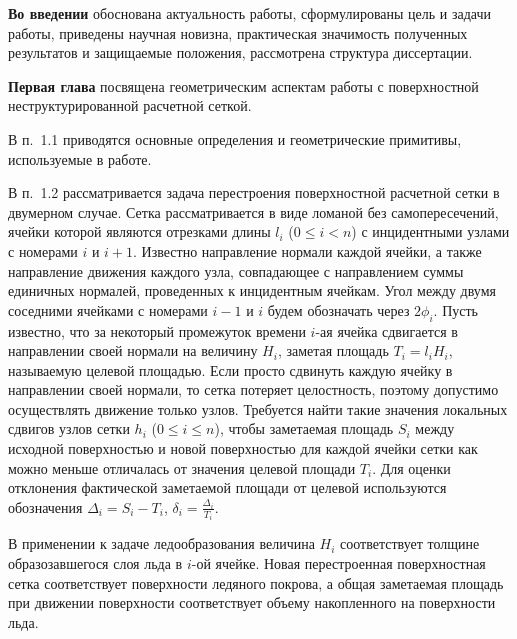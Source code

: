 \documentclass[a4paper,14pt]{extarticle}                     %
\theoremstyle{plain}                                         %
\begin{document}
\textbf{Во введении} обоснована актуальность работы, сформулированы цель и задачи работы, приведены научная новизна, практическая значимость полученных результатов и защищаемые положения, рассмотрена структура диссертации. 


\textbf{Первая глава} посвящена геометрическим аспектам работы с поверхностной неструктурированной расчетной сеткой.


В п.~1.1 приводятся основные определения и геометрические примитивы, используемые в работе.


В п.~1.2 рассматривается задача перестроения поверхностной расчетной сетки в двумерном случае. Сетка рассматривается в виде ломаной без самопересечений, ячейки которой являются отрезками длины $l_i$ ($0 \le i < n$) с инцидентными узлами с номерами $i$ и $i + 1$.
Известно направление нормали каждой ячейки, а также направление движения каждого узла, совпадающее с направлением суммы единичных нормалей, проведенных к инцидентным ячейкам.
Угол между двумя соседними ячейками с номерами $i - 1$ и $i$ будем обозначать через $2 \phi_i$.
Пусть известно, что за некоторый промежуток времени $i$-ая ячейка сдвигается в направлении своей нормали на величину $H_i$, заметая площадь $T_i = l_i H_i$, называемую целевой площадью.
Если просто сдвинуть каждую ячейку в направлении своей нормали, то сетка потеряет целостность, поэтому допустимо осуществлять движение только узлов.
Требуется найти такие значения локальных сдвигов узлов сетки $h_i$ ($0 \le i \le n$), чтобы заметаемая площадь $S_i$ между исходной поверхностью и новой поверхностью для каждой ячейки сетки как можно меньше отличалась от значения целевой площади $T_i$.
Для оценки отклонения фактической заметаемой площади от целевой используются обозначения $\Delta_i = S_i - T_i$, $\delta_i = \frac{\Delta_i}{T_i}$.

В применении к задаче ледообразования величина $H_i$ соответствует толщине образозавшегося слоя льда в $i$-ой ячейке.
Новая перестроенная поверхностная сетка соответствует поверхности ледяного покрова, а общая заметаемая площадь при движении поверхности соответствует объему накопленного на поверхности льда.
\end{document}
